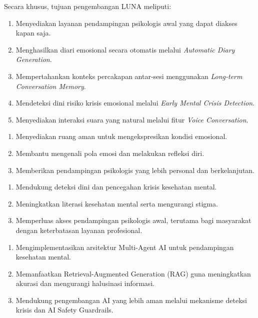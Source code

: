 
Secara khusus, tujuan pengembangan LUNA meliputi:
\begin{enumerate}[leftmargin=*,label=\arabic*.]
    \item Menyediakan layanan pendampingan psikologis awal yang dapat diakses kapan saja.
    \item Menghasilkan diari emosional secara otomatis melalui \textit{Automatic Diary Generation}.
    \item Mempertahankan konteks percakapan antar-sesi menggunakan \textit{Long-term Conversation Memory}.
    \item Mendeteksi dini risiko krisis emosional melalui \textit{Early Mental Crisis Detection}.
    \item Menyediakan interaksi suara yang natural melalui fitur \textit{Voice Conversation}.
\end{enumerate}


\begin{enumerate}[leftmargin=*,label=\arabic*.]
    \item Menyediakan ruang aman untuk mengekspresikan kondisi emosional.
    \item Membantu mengenali pola emosi dan melakukan refleksi diri.
    \item Memberikan pendampingan psikologis yang lebih personal dan berkelanjutan.
\end{enumerate}

\begin{enumerate}[leftmargin=*,label=\arabic*.]
    \item Mendukung deteksi dini dan pencegahan krisis kesehatan mental.
    \item Meningkatkan literasi kesehatan mental serta mengurangi stigma.
    \item Memperluas akses pendampingan psikologis awal, terutama bagi masyarakat dengan keterbatasan layanan profesional.
\end{enumerate}

\begin{enumerate}[leftmargin=*,label=\arabic*.]
    \item Mengimplementasikan arsitektur Multi-Agent AI untuk pendampingan kesehatan mental.
    \item Memanfaatkan Retrieval-Augmented Generation (RAG) guna meningkatkan akurasi dan mengurangi halusinasi informasi.
    \item Mendukung pengembangan AI yang lebih aman melalui mekanisme deteksi krisis dan AI Safety Guardrails.
\end{enumerate}
